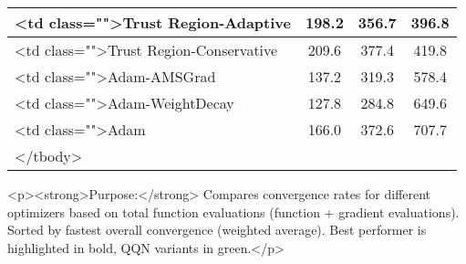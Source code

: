 \documentclass{article}
\begin{document}
\begin{tabular}{|l|c|c|c|}
                <td class="">Trust Region-Adaptive & 
                198.2 & 
                356.7 & 
                396.8 & 
             \\
\hline
            
                <td class="">Trust Region-Conservative & 
                209.6 & 
                377.4 & 
                419.8 & 
             \\
\hline
            
                <td class="">Adam-AMSGrad & 
                137.2 & 
                319.3 & 
                578.4 & 
             \\
\hline
            
                <td class="">Adam-WeightDecay & 
                127.8 & 
                284.8 & 
                649.6 & 
             \\
\hline
            
                <td class="">Adam & 
                166.0 & 
                372.6 & 
                707.7 & 
             \\
\hline
        </tbody>
    \end{tabular}
    <p><strong>Purpose:</strong> Compares convergence rates for different optimizers based on total function evaluations (function + gradient evaluations). Sorted by fastest overall convergence (weighted average). Best performer is highlighted in bold, QQN variants in green.</p>
\end{document}
